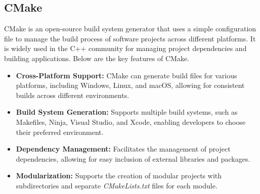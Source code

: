 \subsection{\fontsize{14}{16} CMake}
{
	\fontsize{12}{14}
	CMake is an open-source build system generator that uses a simple configuration file to manage the build process of software projects across different platforms. It is widely used in the C++ community for managing project dependencies and building applications. Below are the key features of CMake.
	\begin{itemize}
		\item \textbf{Cross-Platform Support:} CMake can generate build files for various platforms,
		including Windows, Linux, and macOS, allowing for consistent builds across different
		environments.
		\item \textbf{Build System Generation:} Supports multiple build systems, such as Makefiles, Ninja,
		Visual Studio, and Xcode, enabling developers to choose their preferred environment.
		\item \textbf{Dependency Management:} Facilitates the management of project dependencies,
		allowing for easy inclusion of external libraries and packages.
		\item \textbf{Modularization:} Supports the creation of modular projects with subdirectories and
		separate \emph{CMakeLists.txt} files for each module.
	\end{itemize}
}

